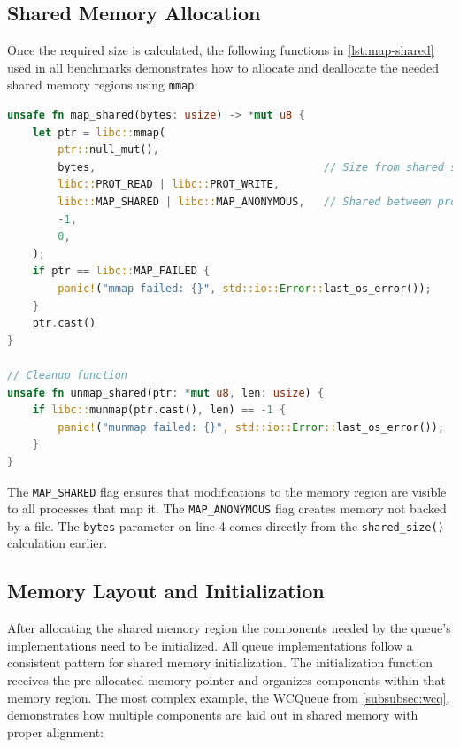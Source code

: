 \subsection{Shared Memory Allocation}

Once the required size is calculated, the following functions in \cref{lst:map-shared} used in all benchmarks demonstrates how to allocate and deallocate the needed shared memory regions using \texttt{mmap}:

\begin{lstlisting}[language=Rust, style=boxed, caption={Shared memory allocation using mmap}, label={lst:map-shared}]
unsafe fn map_shared(bytes: usize) -> *mut u8 {
    let ptr = libc::mmap(
        ptr::null_mut(),
        bytes,                                    // Size from shared_size()
        libc::PROT_READ | libc::PROT_WRITE,
        libc::MAP_SHARED | libc::MAP_ANONYMOUS,   // Shared between processes
        -1,
        0,
    );
    if ptr == libc::MAP_FAILED {
        panic!("mmap failed: {}", std::io::Error::last_os_error());
    }
    ptr.cast()
}

// Cleanup function
unsafe fn unmap_shared(ptr: *mut u8, len: usize) {
    if libc::munmap(ptr.cast(), len) == -1 {
        panic!("munmap failed: {}", std::io::Error::last_os_error());
    }
}
\end{lstlisting}

The \texttt{MAP\_SHARED} flag ensures that modifications to the memory region are visible to all processes that map it. The \texttt{MAP\_ANONYMOUS} flag creates memory not backed by a file. The \texttt{bytes} parameter on line 4 comes directly from the \texttt{shared\_size()} calculation earlier.

\subsection{Memory Layout and Initialization}

After allocating the shared memory region the components needed by the queue's implementations need to be initialized. All queue implementations follow a consistent pattern for shared memory initialization. The initialization function receives the pre-allocated memory pointer and organizes components within that memory region. The most complex example, the WCQueue from \cref{subsubsec:wcq}, demonstrates how multiple components are laid out in shared memory with proper alignment:


